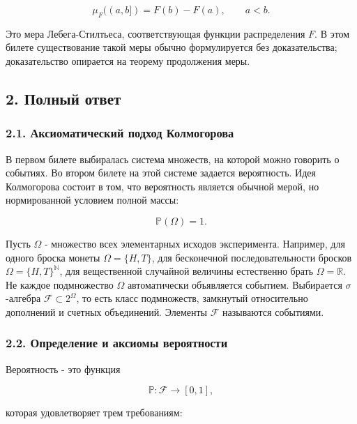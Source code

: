 \documentclass[
  11pt,
  a4paper,
]{article}
\begin{document}
\[
\mu_F((a,b])=F(b)-F(a),\qquad a<b.
\]

Это мера Лебега-Стилтьеса, соответствующая функции распределения \(F\).
В этом билете существование такой меры обычно формулируется без
доказательства; доказательство опирается на теорему продолжения меры.

\subsection{2. Полный
ответ}\label{ux43fux43eux43bux43dux44bux439-ux43eux442ux432ux435ux442}

\subsubsection{2.1. Аксиоматический подход
Колмогорова}\label{ux430ux43aux441ux438ux43eux43cux430ux442ux438ux447ux435ux441ux43aux438ux439-ux43fux43eux434ux445ux43eux434-ux43aux43eux43bux43cux43eux433ux43eux440ux43eux432ux430}

В первом билете выбиралась система множеств, на которой можно говорить о
событиях. Во втором билете на этой системе задается вероятность. Идея
Колмогорова состоит в том, что вероятность является обычной мерой, но
нормированной условием полной массы:

\[
\mathbb P(\Omega)=1.
\]

Пусть \(\Omega\) - множество всех элементарных исходов эксперимента.
Например, для одного броска монеты \(\Omega=\{H,T\}\), для бесконечной
последовательности бросков \(\Omega=\{H,T\}^{\mathbb N}\), для
вещественной случайной величины естественно брать \(\Omega=\mathbb R\).
Не каждое подмножество \(\Omega\) автоматически объявляется событием.
Выбирается \(\sigma\)-алгебра \(\mathcal F\subset 2^\Omega\), то есть
класс подмножеств, замкнутый относительно дополнений и счетных
объединений. Элементы \(\mathcal F\) называются событиями.

\subsubsection{2.2. Определение и аксиомы
вероятности}\label{ux43eux43fux440ux435ux434ux435ux43bux435ux43dux438ux435-ux438-ux430ux43aux441ux438ux43eux43cux44b-ux432ux435ux440ux43eux44fux442ux43dux43eux441ux442ux438}

Вероятность - это функция

\[
\mathbb P:\mathcal F\to[0,1],
\]

которая удовлетворяет трем требованиям:
\end{document}
